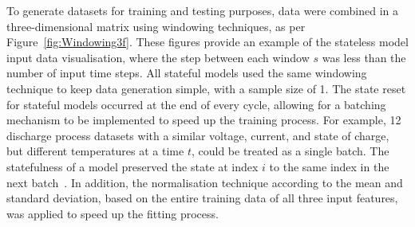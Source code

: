 %
To generate datasets for training and testing purposes, data were combined in a three-dimensional matrix using windowing techniques, as per \mbox{Figure~\ref{fig:Windowing3f}}.
These figures provide an example of the stateless model input data visualisation, where the step between each window $s$ was less than the number of input time steps.
All stateful models used the same windowing technique to keep data generation simple, with a sample size of 1.
The state reset for stateful models occurred at the end of every cycle, allowing for a batching mechanism to be implemented to speed up the training process.
For example, 12 discharge process datasets with a similar voltage, current, and state of charge, but different temperatures at a time $t$, could be treated as a single batch.
The statefulness of a model preserved the state at index $i$ to the same index in the next batch~\cite{zhu_statefulnes_tfdocs_2020}.
In addition, the normalisation technique according to the mean and standard deviation, based on the entire training data of all three input features, was applied to speed up the fitting process.

